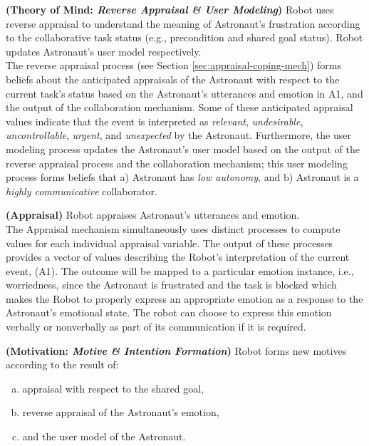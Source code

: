 \noindent\item \textbf{(Theory of Mind: \textit{Reverse Appraisal \& User
Modeling})} Robot uses reverse appraisal to understand the meaning of
Astronaut's frustration according to the collaborative task status (e.g.,
precondition and shared goal status). Robot updates Astronaut's user model
respectively.\\

The reverse appraisal process (see Section \ref{sec:appraisal-coping-mech})
forms beliefs about the anticipated appraisals of the Astronaut with respect to
the current task's status based on the Astronaut's utterances and emotion in A1,
and the output of the collaboration mechanism. Some of these anticipated
appraisal values indicate that the event is interpreted as \textit{relevant},
\textit{undesirable}, \textit{uncontrollable}, \textit{urgent}, and
\textit{unexpected} by the Astronaut. Furthermore, the user modeling process
updates the Astronaut's user model based on the output of the reverse appraisal
process and the collaboration mechanism; this user modeling process forms
beliefs that a) Astronaut has \textit{low autonomy}, and b) Astronaut is a
\textit{highly communicative} collaborator.\\

\noindent\item \textbf{(Appraisal)} Robot appraises Astronaut's utterances and
emotion.\\

The Appraisal mechanism simultaneously uses distinct processes to compute values
for each individual appraisal variable. The output of these processes provides a
vector of values describing the Robot's interpretation of the current event,
(A1). The outcome will be mapped to a particular emotion instance, i.e.,
worriedness, since the Astronaut is frustrated and the task is blocked which
makes the Robot to properly express an appropriate emotion as a response to the
Astronaut's emotional state. The robot can choose to express this emotion
verbally or nonverbally as part of its communication if it is required.\\

\noindent\item \textbf{(Motivation: \textit{Motive \& Intention Formation})}
Robot forms new motives according to the result of:

\begin{enumerate}[a)]
  \item appraisal with respect to the shared goal,
  \item reverse appraisal of the Astronaut's emotion,
  \item and the user model of the Astronaut. 
\end{enumerate}

